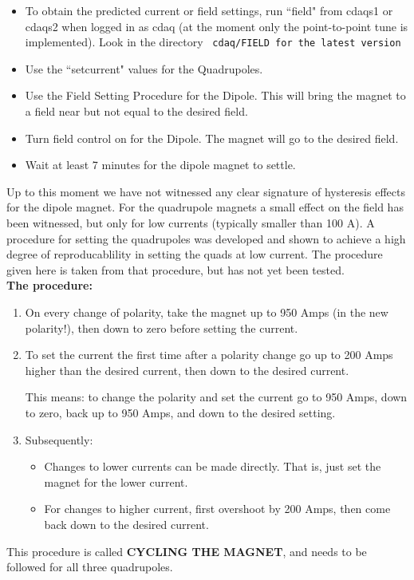 {%
\begin{itemize}
\item{To obtain the predicted current or field settings, run ``field" from
cdaqs1 or cdaqs2 when logged in as cdaq (at the moment
only the point-to-point tune is implemented). Look in the directory 
{\tt ~cdaq/FIELD for the latest version}}
\item{Use the ``setcurrent" values for the Quadrupoles.}
\item{Use the Field Setting Procedure for the Dipole. This will bring the
magnet to a field near but not equal to the desired field.}
\item{Turn field control on for the Dipole. The magnet will go to the
desired field.}
\item{Wait at least 7 minutes for the dipole magnet to settle.}
\end{itemize}

Up to this moment we have not witnessed any clear signature of hysteresis
effects for the dipole magnet. For the quadrupole magnets a small effect
on the field has been witnessed, but only for low currents (typically smaller
than 100 A). A procedure for setting the quadrupoles was developed
and shown to achieve a high
degree of reproducablility in setting the quads at low current.  The procedure
given here is taken from that procedure, but has not yet  been tested.\\
\textbf{The procedure:} 
\begin{enumerate}
  \item{On every change of polarity, take the magnet up to 950 Amps 
     (in the new polarity!), then down to zero before setting the
     current.} 
  \item{To set the current the first time after a polarity change 
     go up to 200 Amps higher than the desired current, 
     then down to the desired current.

     This means: to change the polarity and set the current go to 950 Amps,
     down to zero, back up to 950 Amps, and down to the desired setting.}
  \item{Subsequently:
  \begin{itemize}
     \item{Changes to lower currents can be made directly. 
        That is, just set the magnet for the lower current.}
     \item{For changes to higher current, first overshoot 
        by 200 Amps, then come back down to the desired current.}
  \end{itemize}}
\end{enumerate} 
This procedure is called \textbf{CYCLING
THE MAGNET}, and needs to be  followed for all three quadrupoles.


}
